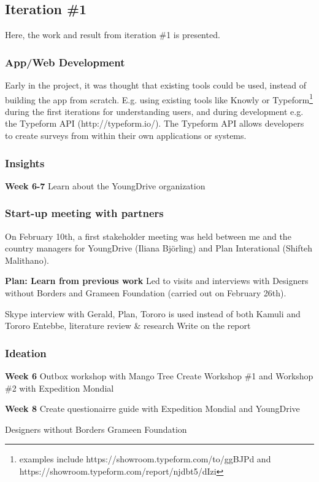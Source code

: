 \subsection{Iteration \#1}
Here, the work and result from iteration \#1 is presented.

\subsubsection{App/Web Development}
Early in the project, it was thought that existing tools could be used, instead of building the app from scratch. E.g. using existing tools like Knowly or Typeform\footnote{examples include https://showroom.typeform.com/to/ggBJPd and https://showroom.typeform.com/report/njdbt5/dIzi} during the first iterations for understanding users, and during development e.g. the Typeform API (http://typeform.io/). The Typeform API allows developers to create surveys from within their own applications or systems.

\subsubsection*{Insights}
\textbf{Week 6-7}
Learn about the YoungDrive organization

\subsubsection{Start-up meeting with partners}
On February 10th, a first stakeholder meeting was held between me and the country managers for YoungDrive (Iliana Björling) and Plan Interational (Shifteh Malithano).

\textbf{Plan: Learn from previous work}
Led to visits and interviews with Designers without Borders and Grameen Foundation (carried out on February 26th).

Skype interview with Gerald, Plan, Tororo is used instead of both Kamuli and Tororo
Entebbe, literature review \& research
Write on the report

\subsubsection*{Ideation}
\textbf{Week 6}
Outbox workshop with Mango Tree
Create Workshop \#1 and Workshop \#2 with Expedition Mondial

\textbf{Week 8}
Create questionairre guide with Expedition Mondial and YoungDrive

Designers without Borders
Grameen Foundation

